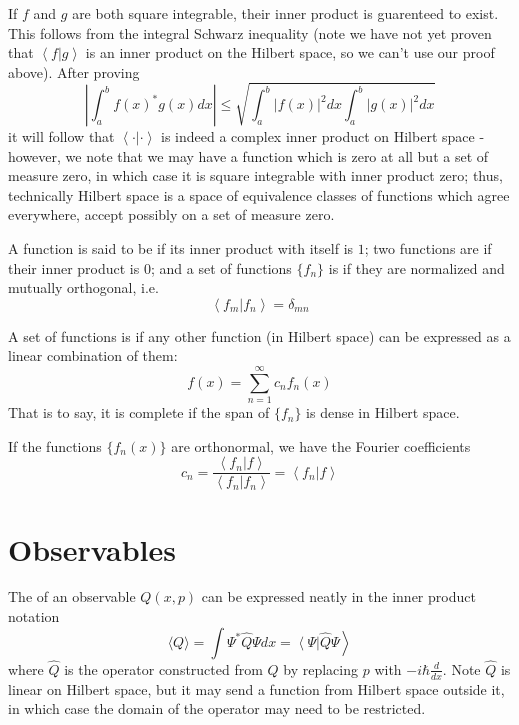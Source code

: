 \documentclass[12pt, a4paper, oneside, openright, titlepage]{book}
\newcommand{\braket}[2]{\left\langle#1\right\vert\left.#2\right\rangle}
\begin{document}
If $f$ and $g$ are both square integrable, their inner product is guarenteed to exist. This follows from the integral Schwarz inequality (note we have not yet proven that $\braket{f}{g}$ is an inner product on the Hilbert space, so we can't use our proof above). After proving $$\left|\int_a^bf(x)^*g(x)dx\right| \leq \sqrt{\int_a^b|f(x)|^2dx \int_a^b|g(x)|^2dx}$$ it will follow that $\braket{\cdot}{\cdot}$ is indeed a complex inner product on Hilbert space - however, we note that we may have a function which is zero at all but a set of measure zero, in which case it is square integrable with inner product zero; thus, technically Hilbert space is a space of equivalence classes of functions which agree everywhere, accept possibly on a set of measure zero.

\begin{defn}
    A function is said to be  if its inner product with itself is $1$; two functions are  if their inner product is $0$; and a set of functions $\{f_n\}$ is  if they are normalized and mutually orthogonal, i.e. $$\braket{f_m}{f_n} = \delta_{mn}$$
\end{defn}

\begin{defn}
    A set of functions is  if any other function (in Hilbert space) can be expressed as a linear combination of them: $$f(x) = \sum_{n=1}^{\infty}c_nf_n(x)$$ That is to say, it is complete if the span of $\{f_n\}$ is dense in Hilbert space.
\end{defn}

If the functions $\{f_n(x)\}$ are orthonormal, we have the Fourier coefficients $$c_n = \frac{\braket{f_n}{f}}{\braket{f_n}{f_n}} = \braket{f_n}{f}$$


\section{Observables}

\begin{defn}
    The  of an observable $Q(x,p)$ can be expressed neatly in the inner product notation $$\langle Q \rangle = \int\Psi^*\hat{Q}\Psi dx = \braket{\Psi}{\hat{Q}\Psi}$$ where $\hat{Q}$ is the operator constructed from $Q$ by replacing $p$ with $-i\hbar\frac{d}{dx}$. Note $\hat{Q}$ is linear on Hilbert space, but it may send a function from Hilbert space outside it, in which case the domain of the operator may need to be restricted.
\end{defn}
\end{document}
